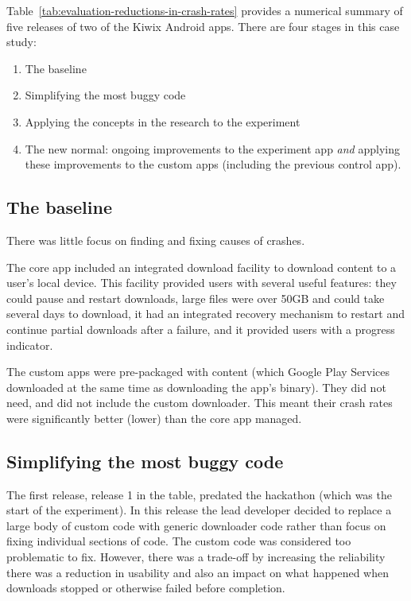 Table~\ref{tab:evaluation-reductions-in-crash-rates} provides a numerical summary of five releases of two of the Kiwix Android apps. There are four stages in this case study:

\begin{enumerate}
    \itemsep0em
    \item The baseline
    \item Simplifying the most buggy code
    \item Applying the concepts in the research to the experiment
    \item The new normal: ongoing improvements to the experiment app \emph{and} applying these improvements to the custom apps (including the previous control app).
\end{enumerate}

\subsection{The baseline}
There was little focus on finding and fixing causes of crashes. 

The core app included an integrated download facility to download content to a user's local device. This facility provided users with several useful features: they could pause and restart downloads, large files were over 50GB and could take several days to download, it had an integrated recovery mechanism to restart and continue partial downloads after a failure, and it provided users with a progress indicator.

The custom apps were pre-packaged with content (which Google Play Services downloaded at the same time as downloading the app's binary). They did not need, and did not include the custom downloader. This meant their crash rates were significantly better (lower) than the core app managed.

\subsection{Simplifying the most buggy code}
The first release, release 1 in the table, predated the hackathon (which was the start of the experiment). In this release the lead developer decided to replace a large body of custom code with generic downloader code rather than focus on fixing individual sections of code. The custom code was considered too problematic to fix. However, there was a trade-off by increasing the reliability there was a reduction in usability and also an impact on what happened when downloads stopped or otherwise failed before completion.

